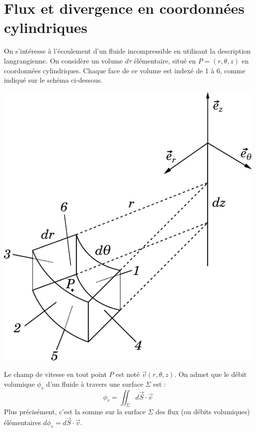 \documentclass{report}
\begin{document}
\section*{Flux et divergence en coordonnées cylindriques}

On s'intéresse à l'écoulement d'un fluide incompressible en utilisant la description langrangienne. On considère un volume $d\tau$ élémentaire, situé en $P=(r,\theta,z)$ en coordonnées cylindriques. Chaque face de ce volume est indexé de 1 à 6, comme indiqué sur le schéma ci-dessous.

\begin{center}
	\includegraphics[scale=0.65]{div_meca_flu.pdf}
\end{center}

Le champ de vitesse en tout point $P$ est noté $\vec{v}(r,\theta,z)$. On admet que le débit volumique $\phi_v$ d'un fluide à travers une surface $\Sigma$ est :
\begin{equation}
\label{eq:debit}
	\phi_v = \iint _\Sigma d\vec{S}\cdot\vec{v}
\end{equation}
Plus précisément, c'est la somme sur la surface $\Sigma$ des flux (ou débits volumiques) élémentaires $d\phi_v=d\vec{S}\cdot\vec{v}$.
\end{document}
